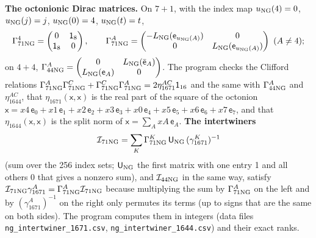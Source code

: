 \documentclass[
  10pt,
]{article}
\begin{document}
\textbf{The octonionic Dirac matrices.} On \(7+1\), with the index map
\(u_{\rm NG}(4)=0\), \(u_{\rm NG}(j)=j\), \(u_{\rm NG}(0)=4\),
\(u_{\rm NG}(t)=t\),
\[\Gamma^4_{71\rm NG}=\begin{pmatrix}0&\mathsf 1_8\\ \mathsf 1_8&0\end{pmatrix},\qquad
\Gamma^A_{71\rm NG}=\begin{pmatrix}-L_{\rm NG}(\mathsf e_{u_{\rm NG}(A)})&0\\0&L_{\rm NG}(\mathsf e_{u_{\rm NG}(A)})\end{pmatrix}\ (A\ne4);\]
on \(4+4\),
\(\Gamma^A_{44\rm NG}=\begin{pmatrix}0&L_{\rm NG}(\bar{\mathsf e}_A)\\L_{\rm NG}(\mathsf e_A)&0\end{pmatrix}\).
The program checks the Clifford relations
\(\Gamma^A_{71\rm NG}\Gamma^C_{71\rm NG}+\Gamma^C_{71\rm NG}\Gamma^A_{71\rm NG}=2\eta^{AC}_{1671}\mathsf 1_{16}\)
and the same with \(\Gamma^A_{44\rm NG}\) and \(\eta^{AC}_{1644}\), that
\(\eta_{1671}(\mathsf x,\mathsf x)\) is the real part of the square of
the octonion
\(\mathsf x=x4\,\mathsf e_0+x1\,\mathsf e_1+x2\,\mathsf e_2+x3\,\mathsf e_3+ x0\,\mathsf e_4+x5\,\mathsf e_5+x6\,\mathsf e_6+x7\,\mathsf e_7\),
and that \(\eta_{1644}(\mathsf x,\mathsf x)\) is the split norm of
\(\mathsf x=\sum_AxA\,\mathsf e_A\). \textbf{The intertwiners}
\[\mathcal I_{71\rm NG}=\sum_K\Gamma^K_{71\rm NG}\,\mathsf U_{\rm NG}\,(\gamma^K_{1671})^{-1}\]
(sum over the 256 index sets; \(\mathsf U_{\rm NG}\) the first matrix
with one entry 1 and all others 0 that gives a nonzero sum), and
\(\mathcal I_{44\rm NG}\) in the same way, satisfy
\(\mathcal I_{71\rm NG}\gamma^A_{1671}=\Gamma^A_{71\rm NG}\mathcal I_{71\rm NG}\)
because multiplying the sum by \(\Gamma^A_{71\rm NG}\) on the left and
by \((\gamma^A_{1671})^{-1}\) on the right only permutes its terms (up
to signs that are the same on both sides). The program computes them in
integers (data files \texttt{ng\_intertwiner\_1671.csv},
\texttt{ng\_intertwiner\_1644.csv}) and their exact ranks.
\end{document}
